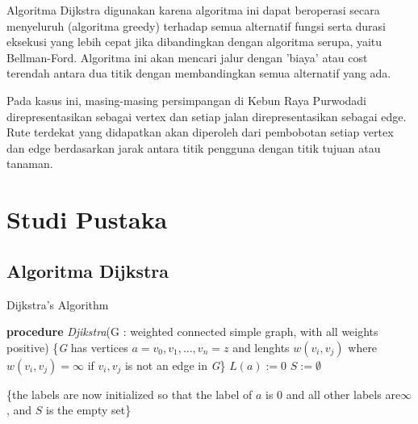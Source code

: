 \documentclass[conference]{IEEEtran}
\begin{document}
	Algoritma Dijkstra digunakan karena algoritma ini dapat beroperasi secara menyeluruh (algoritma greedy) terhadap semua alternatif fungsi serta durasi eksekusi yang lebih cepat jika dibandingkan dengan algoritma serupa, yaitu Bellman-Ford. Algoritma ini akan mencari jalur dengan ’biaya’ atau cost terendah antara dua titik dengan membandingkan semua alternatif yang ada.

	Pada kasus ini, masing-masing persimpangan di Kebun Raya Purwodadi direpresentasikan sebagai vertex dan setiap jalan direpresentasikan sebagai edge. Rute terdekat yang didapatkan akan diperoleh dari pembobotan setiap vertex dan edge berdasarkan jarak antara titik pengguna dengan titik tujuan atau tanaman.

\section{Studi Pustaka}
\subsection{Algoritma Dijkstra}

\begin{algorithm}
\caption{Dijkstra's Algorithm }\label{alg:one}
\textbf{procedure} \textit{Djikstra}(G : weighted connected simple graph, with all weights positive)
\newline
\{\textit G has vertices $a = v_0,v_1, ..., v_n = z$ and lenghts $w(v_i, v_j)$ where $w(v_i, v_j) = \infty$ if $v_i, v_j$ is not an edge in \textit G\}
\newline
{}
$L(a) := 0 $
\newline
$S := \emptyset$ 

\{the labels are now initialized so that the label of $a$ is 0 and all other labels are$\infty$, and $S$ is the empty set\}
\end{algorithm}
\end{document}
